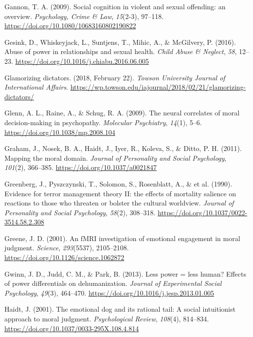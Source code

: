 \documentclass[
  donotrepeattitle,doc, 12pt, a4paper,floatsintext]{apa7}
\newlength{\cslhangindent}
\newlength{\cslentryspacingunit} %
\newenvironment{CSLReferences}[2] %
 {%
  \setlength{\parindent}{0pt}
  \ifodd #1
  \let\oldpar\par
  \def\par{\hangindent=\cslhangindent\oldpar}
  \fi
  \setlength{\parskip}{#2\cslentryspacingunit}
 }%
 {}
\begin{document}
\begin{CSLReferences}{1}{0}
\leavevmode{}%
Gannon, T. A. (2009). Social cognition in violent and sexual offending: an overview. \emph{Psychology, Crime \& Law}, \emph{15}(2-3), 97--118. \url{https://doi.org/10.1080/10683160802190822}

\leavevmode{}%
Gesink, D., Whiskeyjack, L., Suntjens, T., Mihic, A., \& McGilvery, P. (2016). Abuse of power in relationships and sexual health. \emph{Child Abuse \& Neglect}, \emph{58}, 12--23. \url{https://doi.org/10.1016/j.chiabu.2016.06.005}

\leavevmode{}%
Glamorizing dictators. (2018, February 22). \emph{Towson University Journal of International Affairs}. \url{https://wp.towson.edu/iajournal/2018/02/21/glamorizing-dictators/}

\leavevmode{}%
Glenn, A. L., Raine, A., \& Schug, R. A. (2009). The neural correlates of moral decision-making in psychopathy. \emph{Molecular Psychiatry}, \emph{14}(1), 5--6. \url{https://doi.org/10.1038/mp.2008.104}

\leavevmode{}%
Graham, J., Nosek, B. A., Haidt, J., Iyer, R., Koleva, S., \& Ditto, P. H. (2011). Mapping the moral domain. \emph{Journal of Personality and Social Psychology}, \emph{101}(2), 366--385. \url{https://doi.org/10.1037/a0021847}

\leavevmode{}%
Greenberg, J., Pyszczynski, T., Solomon, S., Rosenblatt, A., \& et al. (1990). Evidence for terror management theory II: the effects of mortality salience on reactions to those who threaten or bolster the cultural worldview. \emph{Journal of Personality and Social Psychology}, \emph{58}(2), 308--318. \url{https://doi.org/10.1037/0022-3514.58.2.308}

\leavevmode{}%
Greene, J. D. (2001). An fMRI investigation of emotional engagement in moral judgment. \emph{Science}, \emph{293}(5537), 2105--2108. \url{https://doi.org/10.1126/science.1062872}

\leavevmode{}%
Gwinn, J. D., Judd, C. M., \& Park, B. (2013). Less power = less human? Effects of power differentials on dehumanization. \emph{Journal of Experimental Social Psychology}, \emph{49}(3), 464--470. \url{https://doi.org/10.1016/j.jesp.2013.01.005}

\leavevmode{}%
Haidt, J. (2001). The emotional dog and its rational tail: A social intuitionist approach to moral judgment. \emph{Psychological Review}, \emph{108}(4), 814--834. \url{https://doi.org/10.1037/0033-295X.108.4.814}


\end{CSLReferences}
\end{document}
